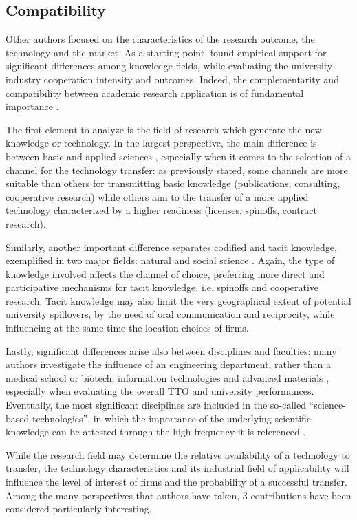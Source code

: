 \subsection{Compatibility}

Other authors focused on the characteristics of the research outcome, the technology and the market. As a starting point, \citet{Tijssen2006} found empirical support for significant differences among knowledge fields, while evaluating the university-industry cooperation intensity and outcomes. Indeed, the complementarity and compatibility between academic research application is of fundamental importance \citep{Geuna2009}.

The first element to analyze is the field of research which generate the new knowledge or technology. In the largest perspective, the main difference is between basic and applied sciences \citep{DEste2007}, especially when it comes to the selection of a channel for the technology transfer: as previously stated, some channels are more suitable than others for transmitting basic knowledge (publications, consulting, cooperative research) while others aim to the transfer of a more applied technology characterized by a higher readiness (licenses, spinoffs, contract research).

Similarly, another important difference separates codified and tacit knowledge, exemplified in two major fields: natural and social science \citep{Audretsch2004}. Again, the type of knowledge involved affects the channel of choice, preferring more direct and participative mechanisms for tacit knowledge, i.e. spinoffs and cooperative research. Tacit knowledge may also limit the very geographical extent of potential university spillovers, by the need of oral communication and reciprocity, while influencing at the same time the location choices of firms.

Lastly, significant differences arise also between disciplines and faculties: many authors investigate the influence of an engineering department, rather than a medical school or biotech, information technologies and advanced materials \citep{DEste2007}, especially when evaluating the overall TTO and university performances. Eventually, the most significant disciplines are included in the so-called \enquote{science-based technologies}, in which the importance of the underlying scientific knowledge can be attested through the high frequency it is referenced \citep{Debackere2005}.

While the research field may determine the relative availability of a technology to transfer, the technology characteristics and its industrial field of applicability will influence the level of interest of firms and the probability of a successful transfer. Among the many perspectives that authors have taken, 3 contributions have been considered particularly interesting.

